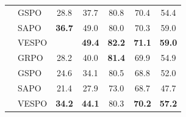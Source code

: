 \documentclass{article}
\theoremstyle{plain}
\theoremstyle{definition}
\theoremstyle{remark}
\begin{document}
\begin{table}[h]
\begin{small}
\begin{tabular}{@{}l|l|ccccc@{}}
            & GSPO                          & 28.8                                  & 37.7                                  & 80.8                                  & 70.4                                  & 54.4                                  \\
            & SAPO                          & \textbf{36.7}                         & {49.0}                                & 80.0                                  & 70.3                                  & 59.0                                  \\
            & VESPO &         & \textbf{49.4} & \textbf{82.2} & \textbf{71.1} & \textbf{59.0} \\
      \midrule
            & GRPO                          & 28.2                                  & 40.0                                  & \textbf{81.4}                         & 69.9                                  & 54.9                                  \\
            & GSPO                          & 24.6                                  & 34.1                                  & 80.5                                  & 68.8                                  & 52.0                                  \\
            & SAPO                          & 21.4                                  & 27.9                                  & 73.0                                  & 68.7                                  & 47.7                                  \\
            & VESPO & \textbf{34.2} & \textbf{44.1} & 80.3          & \textbf{70.2} & \textbf{57.2} \\
      \bottomrule
    \end{tabular}
  \end{small}
\end{table}
\end{document}
